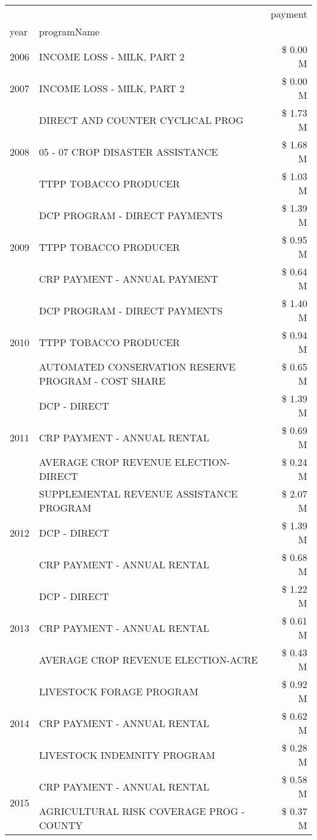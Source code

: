 \begin{tabular}{llr}
\toprule
 &  & payment \\
year & programName &  \\
\midrule
2006 & INCOME LOSS - MILK, PART 2 & \$ 0.00 M \\
\cline{1-3}
2007 & INCOME LOSS - MILK, PART 2 & \$ 0.00 M \\
\cline{1-3}
\multirow[t]{3}{*}{2008} & DIRECT AND COUNTER CYCLICAL PROG & \$ 1.73 M \\
 & 05 - 07 CROP DISASTER ASSISTANCE & \$ 1.68 M \\
 & TTPP TOBACCO PRODUCER & \$ 1.03 M \\
\cline{1-3}
\multirow[t]{3}{*}{2009} & DCP PROGRAM - DIRECT PAYMENTS & \$ 1.39 M \\
 & TTPP TOBACCO PRODUCER & \$ 0.95 M \\
 & CRP PAYMENT - ANNUAL PAYMENT & \$ 0.64 M \\
\cline{1-3}
\multirow[t]{3}{*}{2010} & DCP PROGRAM - DIRECT PAYMENTS & \$ 1.40 M \\
 & TTPP TOBACCO PRODUCER & \$ 0.94 M \\
 & AUTOMATED CONSERVATION RESERVE PROGRAM - COST SHARE & \$ 0.65 M \\
\cline{1-3}
\multirow[t]{3}{*}{2011} & DCP - DIRECT & \$ 1.39 M \\
 & CRP PAYMENT - ANNUAL RENTAL & \$ 0.69 M \\
 & AVERAGE CROP REVENUE ELECTION-DIRECT & \$ 0.24 M \\
\cline{1-3}
\multirow[t]{3}{*}{2012} & SUPPLEMENTAL REVENUE ASSISTANCE PROGRAM & \$ 2.07 M \\
 & DCP - DIRECT & \$ 1.39 M \\
 & CRP PAYMENT - ANNUAL RENTAL & \$ 0.68 M \\
\cline{1-3}
\multirow[t]{3}{*}{2013} & DCP - DIRECT & \$ 1.22 M \\
 & CRP PAYMENT - ANNUAL RENTAL & \$ 0.61 M \\
 & AVERAGE CROP REVENUE ELECTION-ACRE & \$ 0.43 M \\
\cline{1-3}
\multirow[t]{3}{*}{2014} & LIVESTOCK FORAGE PROGRAM & \$ 0.92 M \\
 & CRP PAYMENT - ANNUAL RENTAL & \$ 0.62 M \\
 & LIVESTOCK INDEMNITY PROGRAM & \$ 0.28 M \\
\cline{1-3}
\multirow[t]{3}{*}{2015} & CRP PAYMENT - ANNUAL RENTAL & \$ 0.58 M \\
 & AGRICULTURAL RISK COVERAGE PROG - COUNTY & \$ 0.37 M \\

\end{tabular}
